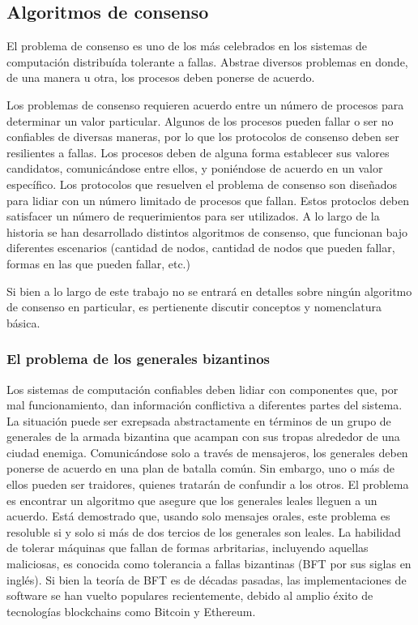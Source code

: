 \subsection{Algoritmos de consenso}\label{subsubsec:consensus}
El problema de consenso es uno de los más celebrados en los sistemas de computación distribuída tolerante a fallas.
%
Abstrae diversos problemas en donde, de una manera u otra, los procesos deben ponerse de acuerdo.
%

Los problemas de consenso requieren acuerdo entre un número de procesos para determinar un valor particular.
%
Algunos de los procesos pueden fallar o ser no confiables de diversas maneras, por lo que los protocolos de
consenso deben ser resilientes a fallas.
%
Los procesos deben de alguna forma establecer sus valores candidatos, comunicándose entre ellos, y
poniéndose de acuerdo en un valor específico.
%
Los protocolos que resuelven el problema de consenso son diseñados para lidiar con un número limitado de procesos
que fallan.
%
Estos protoclos deben satisfacer un número de requerimientos para ser utilizados.
%
A lo largo de la historia se han desarrollado distintos algoritmos de consenso, que funcionan bajo diferentes
escenarios (cantidad de nodos, cantidad de nodos que pueden fallar, formas en las que pueden fallar, etc.)

%

Si bien a lo largo de este trabajo no se entrará en detalles sobre ningún algoritmo de consenso en particular,
es pertienente discutir conceptos y nomenclatura básica.

\subsubsection{El problema de los generales bizantinos}

Los sistemas de computación confiables deben lidiar con componentes que, por mal funcionamiento,
dan información conflictiva a diferentes partes del sistema. La situación puede ser exrepsada abstractamente
en términos de un grupo de generales de la armada bizantina que acampan con sus tropas alrededor de una
ciudad enemiga. Comunicándose solo a través de mensajeros, los generales deben ponerse de acuerdo en una plan
de batalla común. Sin embargo, uno o más de ellos pueden ser traidores, quienes tratarán de confundir a los
otros. El problema es encontrar un algoritmo que asegure que los generales leales lleguen a un acuerdo.
Está demostrado que, usando solo mensajes orales, este problema es resoluble si y solo si más de dos tercios
de los generales son leales.
La habilidad de tolerar máquinas que fallan de formas arbritarias, incluyendo aquellas maliciosas,
es conocida como tolerancia a fallas bizantinas (BFT por sus siglas en inglés). Si bien la teoría de
BFT es de décadas pasadas, las implementaciones de software se han vuelto populares recientemente,
debido al amplio éxito de tecnologías blockchains como Bitcoin y Ethereum.


